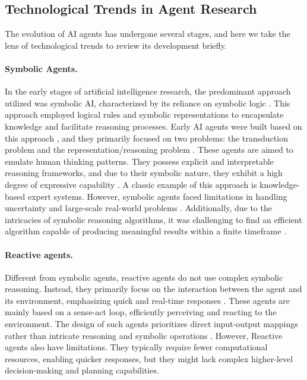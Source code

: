 \documentclass{article}
\begin{document}




\subsection{Technological Trends in Agent Research}\label{sec:Technological Trends in Agent Research}

The evolution of AI agents has undergone several stages, and here we take the lens  of technological trends to review its development briefly.


\paragraph{Symbolic Agents.}
In the early stages of artificial intelligence research, the predominant approach utilized was symbolic AI, characterized by its reliance on symbolic logic \cite{DBLP:journals/cacm/NewellS76,DBLP:books/mk/Ginsberg93}. This approach employed logical rules and symbolic representations to encapsulate knowledge and facilitate reasoning processes. 
Early AI agents were built based on this approach \cite{DBLP:books/daglib/0066946}, and they primarily focused on two problems: the transduction problem and the representation/reasoning problem \cite{shardlow1990action}. 
These agents are aimed to emulate human thinking patterns. They possess explicit and interpretable reasoning frameworks, and due to their symbolic nature, they exhibit a high degree of expressive capability \cite{DBLP:conf/ijcai/FikesN71,DBLP:conf/ijcai/Sacerdoti73,DBLP:conf/ijcai/Sacerdoti75}. A classic example of this approach is knowledge-based expert systems. 
However, symbolic agents faced limitations in handling uncertainty and large-scale real-world problems \cite{Guha_Lenat_1994,kaelbling1987architecture}. Additionally, due to the intricacies of symbolic reasoning algorithms, it was challenging to find an efficient algorithm capable of producing meaningful results within a finite timeframe \cite{kaelbling1987architecture,russell1991right}.

\paragraph{Reactive agents.}
Different from symbolic agents, reactive agents do not use complex symbolic reasoning. Instead, they primarily focus on the interaction between the agent and its environment, emphasizing quick and real-time responses \cite{brooks1991intelligence,maes1990designing,kaelbling1987architecture,DBLP:conf/ijcai/Schoppers87,DBLP:journals/trob/Brooks86}. 
These agents are mainly based on a sense-act loop, efficiently perceiving and reacting to the environment. The design of such agents prioritizes direct input-output mappings rather than intricate reasoning and symbolic operations \cite{nilsson1992toward}. 
However, Reactive agents also have limitations. They typically require fewer computational resources, enabling quicker responses, but they might lack complex higher-level decision-making and planning capabilities.
\end{document}
